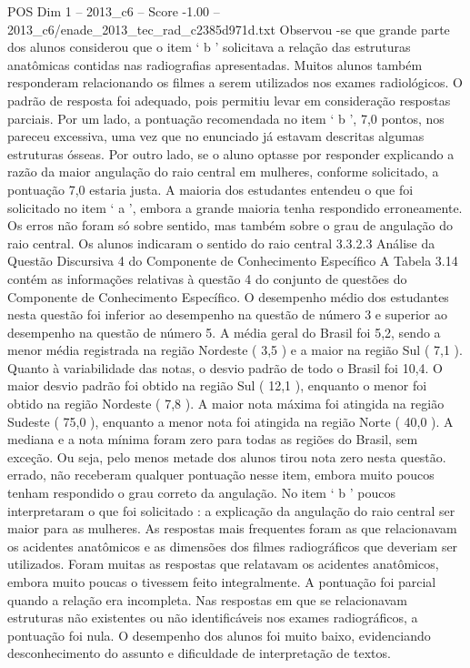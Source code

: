 \begin{textsample}{POS Dim 1 – 2013\_c6 – Score -1.00 – 2013\_c6/enade\_2013\_tec\_rad\_c2385d971d.txt}
Observou -se que grande parte dos alunos considerou que o item ‘ b ’ solicitava a relação das estruturas anatômicas contidas nas radiografias apresentadas.
Muitos alunos também responderam relacionando os filmes a serem utilizados nos exames radiológicos.
O padrão de resposta foi adequado, pois permitiu levar em consideração respostas parciais.
Por um lado, a pontuação recomendada no item ‘ b ’, 7,0 pontos, nos pareceu excessiva, uma vez que no enunciado já estavam descritas algumas estruturas ósseas.
Por outro lado, se o aluno optasse por responder explicando a razão da maior angulação do raio central em mulheres, conforme solicitado, a pontuação 7,0 estaria justa.
A maioria dos estudantes entendeu o que foi solicitado no item ‘ a ’, embora a grande maioria tenha respondido erroneamente.
Os erros não foram só sobre sentido, mas também sobre o grau de angulação do raio central.
Os alunos indicaram o sentido do raio central 3.3.2.3 Análise da Questão Discursiva 4 do Componente de Conhecimento Específico A Tabela 3.14 contém as informações relativas à questão 4 do conjunto de questões do Componente de Conhecimento Específico.
O desempenho médio dos estudantes nesta questão foi inferior ao desempenho na questão de número 3 e superior ao desempenho na questão de número 5.
A média geral do Brasil foi 5,2, sendo a menor média registrada na região Nordeste ( 3,5 ) e a maior na região Sul ( 7,1 ).
Quanto à variabilidade das notas, o desvio padrão de todo o Brasil foi 10,4.
O maior desvio padrão foi obtido na região Sul ( 12,1 ), enquanto o menor foi obtido na região Nordeste ( 7,8 ).
A maior nota máxima foi atingida na região Sudeste ( 75,0 ), enquanto a menor nota foi atingida na região Norte ( 40,0 ).
A mediana e a nota mínima foram zero para todas as regiões do Brasil, sem exceção.
Ou seja, pelo menos metade dos alunos tirou nota zero nesta questão. errado, não receberam qualquer pontuação nesse item, embora muito poucos tenham respondido o grau correto da angulação.
No item ‘ b ’ poucos interpretaram o que foi solicitado : a explicação da angulação do raio central ser maior para as mulheres.
As respostas mais frequentes foram as que relacionavam os acidentes anatômicos e as dimensões dos filmes radiográficos que deveriam ser utilizados.
Foram muitas as respostas que relatavam os acidentes anatômicos, embora muito poucas o tivessem feito integralmente.
A pontuação foi parcial quando a relação era incompleta.
Nas respostas em que se relacionavam estruturas não existentes ou não identificáveis nos exames radiográficos, a pontuação foi nula.
O desempenho dos alunos foi muito baixo, evidenciando desconhecimento do assunto e dificuldade de interpretação de textos.

\end{textsample}
